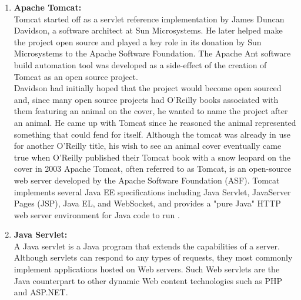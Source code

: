 \documentclass[10pt,a4paper]
{article}
\numberwithin{table}{section}
\begin{document}
{{\begin{normalsize}
\begin{enumerate}
\hspace*{0.3cm}Released under the terms of the Eclipse Public License, Eclipse SDK is free and open-source software (although it is incompatible with the GNU General Public License. It was one of the first IDEs to run under GNU Classpath and it runs without problems under IcedTea  \\
  

\item \textbf{Apache Tomcat:}\\
\hspace*{0.3cm}Tomcat started off as a servlet reference implementation by James Duncan Davidson, a software architect at Sun Microsystems. He later helped make the project open source and played a key role in its donation by Sun Microsystems to the Apache Software Foundation. The Apache Ant software build automation tool was developed as a side-effect of the creation of Tomcat as an open source project.\\
\hspace*{0.3cm}Davidson had initially hoped that the project would become open sourced and, since many open source projects had O'Reilly books associated with them featuring an animal on the cover, he wanted to name the project after an animal. He came up with Tomcat since he reasoned the animal represented something that could fend for itself. Although the tomcat was already in use for another O'Reilly title, his wish to see an animal cover eventually came true when O'Reilly published their Tomcat book with a snow leopard on the cover in 2003
Apache Tomcat, often referred to as Tomcat, is an open-source web server developed by the Apache Software Foundation (ASF). Tomcat implements several Java EE specifications including Java Servlet, JavaServer Pages (JSP), Java EL, and WebSocket, and provides a "pure Java" HTTP web server environment for Java code to run .\\



\item \textbf{Java Servlet:}\\
\hspace*{0.3cm}A Java servlet is a Java program that extends the capabilities of a server. Although servlets can respond to any types of requests, they most commonly implement applications hosted on Web servers. Such Web servlets are the Java counterpart to other dynamic Web content technologies such as PHP and ASP.NET.


\end{enumerate}
\end{normalsize}}}
\end{document}

